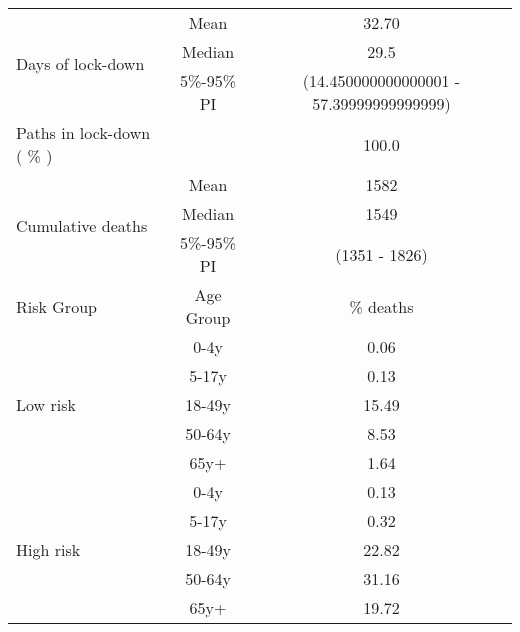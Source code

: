 \documentclass{article}
\begin{document}
\begin{table}[th]
\centering
\begin{tabular}{p{4cm}cc}
\toprule
\multirow{3}{*}{Days   of lock-down} & Mean      & 32.70                        \\ \cmidrule(l){2-3} 
                                     & Median    & 29.5                      \\ \cmidrule(l){2-3} 
                                     & 5\%-95\% PI & (14.450000000000001 - 57.39999999999999)       \\ \midrule 
\multirow{1}{*}{Paths in lock-down ( \% )} &      &         100.0              \\   \midrule                     
\multirow{3}{\hsize}{Cumulative deaths}       & Mean      & 1582 \\ \cmidrule(l){2-3} 
                                     & Median    & 1549                        \\ \cmidrule(l){2-3} 
                                     & 5\%-95\% PI & (1351 - 1826)           \\  \midrule
Risk Group                           & Age Group & \multicolumn{1}{c}{\% deaths}        \\  \midrule
\multirow{5}{*}{Low   risk}          & 0-4y      & 0.06                         \\ \cmidrule(l){2-3} 
                                     & 5-17y     & 0.13                         \\ \cmidrule(l){2-3} 
                                     & 18-49y    & 15.49                         \\ \cmidrule(l){2-3} 
                                     & 50-64y    & 8.53                         \\ \cmidrule(l){2-3} 
                                     & 65y+      & 1.64                         \\ \midrule
\multirow{5}{*}{High   risk}         & 0-4y      & 0.13                         \\ \cmidrule(l){2-3} 
                                     & 5-17y     & 0.32                         \\ \cmidrule(l){2-3} 
                                     & 18-49y    & 22.82                         \\ \cmidrule(l){2-3} 
                                     & 50-64y    & 31.16                         \\ \cmidrule(l){2-3} 
                                     & 65y+      & 19.72                         \\ \midrule

\end{tabular}
\end{table}
\end{document}
